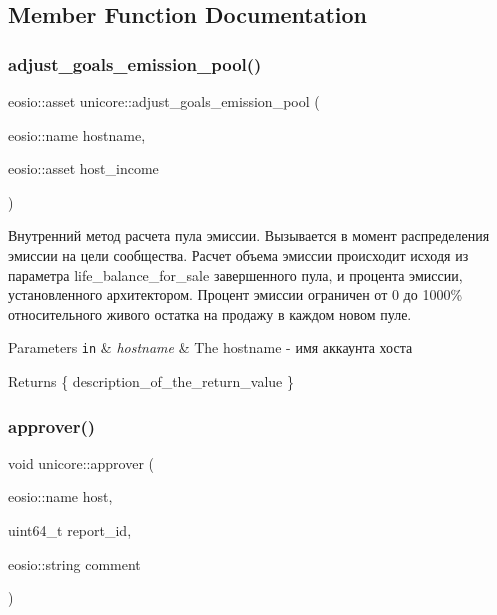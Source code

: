 \subsection{Member Function Documentation}
\mbox{\label{classunicore_aacdeaae7b4b591419bd366661b92cd27}} 
\subsubsection{\texorpdfstring{adjust\+\_\+goals\+\_\+emission\+\_\+pool()}{adjust\_goals\_emission\_pool()}}
{\footnotesize\ttfamily eosio\+::asset unicore\+::adjust\+\_\+goals\+\_\+emission\+\_\+pool (\begin{DoxyParamCaption}\item[{eosio\+::name}]{hostname,  }\item[{eosio\+::asset}]{host\+\_\+income }\end{DoxyParamCaption})\hspace{0.3cm}{\ttfamily [static]}}



Внутренний метод расчета пула эмиссии. Вызывается в момент распределения эмиссии на цели сообщества. Расчет объема эмиссии происходит исходя из параметра life\+\_\+balance\+\_\+for\+\_\+sale завершенного пула, и процента эмиссии, установленного архитектором. Процент эмиссии ограничен от 0 до 1000\% относительного живого остатка на продажу в каждом новом пуле. 


\begin{DoxyParams}[1]{Parameters}
\mbox{\tt in}  & {\em hostname} & The hostname -\/ имя аккаунта хоста\\
\hline
\end{DoxyParams}
\begin{DoxyReturn}{Returns}
\{ description\+\_\+of\+\_\+the\+\_\+return\+\_\+value \} 
\end{DoxyReturn}
\mbox{\label{classunicore_a765b3c6b36dc26922fec8c1236e3d154}} 
\subsubsection{\texorpdfstring{approver()}{approver()}}
{\footnotesize\ttfamily void unicore\+::approver (\begin{DoxyParamCaption}\item[{eosio\+::name}]{host,  }\item[{uint64\+\_\+t}]{report\+\_\+id,  }\item[{eosio\+::string}]{comment }\end{DoxyParamCaption})}



